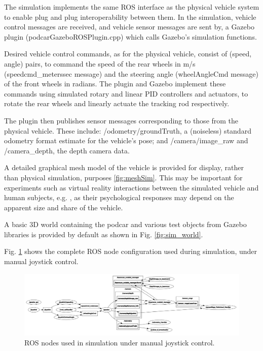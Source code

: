 \documentclass[a4paper]{article}
\begin{document}
The simulation implements the same ROS interface as the physical vehicle system to enable plug and plug interoperability between them.  In the simulation, vehicle control messages are received, and vehicle sensor messages are sent by, a Gazebo plugin (podcarGazeboROSPlugin.cpp) which calls Gazebo’s simulation functions.  

Desired vehicle control commands, as for the physical vehicle, consist of (speed, angle) pairs, to command the speed of the rear wheels in m/s (speedcmd\_meterssec message) and the steering angle (wheelAngleCmd message) of the front wheels in radians.  The plugin and Gazebo implement these commands using simulated rotary and linear PID controllers and actuators, to rotate the rear wheels and linearly actuate the tracking rod respectively.

The plugin then publishes sensor messages corresponding to those from the physical vehicle. These include:  /odometry/groundTruth, a (noiseless) standard odometry format estimate for the vehicle’s pose; and /camera/image\_raw and /camera\_depth, the depth camera data.

A detailed graphical mesh model of the vehicle is provided for display, rather than physical simulation, purposes \ref{fig:meshSim}.  This may be important for experiments such as virtual reality interactions between the simulated vehicle and human subjects, e.g. \cite{camara2021evaluating}, as their psychological responses may depend on the apparent size and share of the vehicle.

A basic 3D world containing the podcar and various test objects from Gazebo libraries is provided by default as shown in Fig. \ref{fig:sim_world}.

Fig. \ref{fig:sim_nodes} shows the complete ROS node configuration used during simulation, under manual joystick control.  
\begin{figure}[h]
	\includegraphics[width=\columnwidth]{figs_sim/sim_nodes.png}
	\caption{ROS nodes used in simulation under manual joystick control.}
	\label{fig:sim_nodes}
\end{figure}
\end{document}
